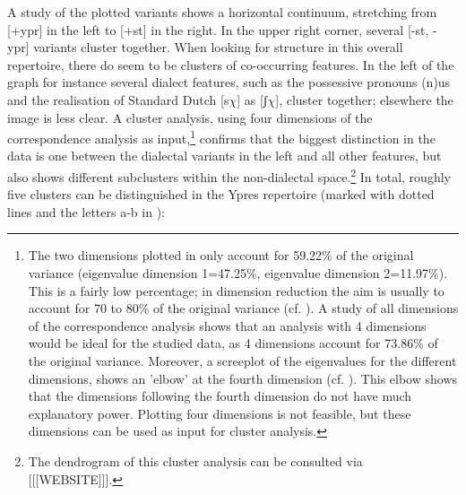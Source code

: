 \documentclass[output=paper]{LSP/langsci}
\begin{document}
A study of the plotted variants shows a horizontal continuum, stretching from [+ypr] in the left to [+st] in the right. In the upper right corner, several [-st, -ypr] variants cluster together. When looking for structure in this overall repertoire, there do seem to be clusters of co-occurring features. In the left of the graph for instance several dialect features, such as the possessive pronouns (n)us and the realisation of Standard Dutch [s$\chi $] as [ʃ$\chi $], cluster together; elsewhere the image is less clear. A cluster analysis, using four dimensions of the correspondence analysis as input,\footnote{The two dimensions plotted in  only account for 59.22\% of the original variance (eigenvalue dimension 1=47.25\%, eigenvalue dimension 2=11.97\%). This is a fairly low percentage; in dimension reduction the aim is usually to account for 70 to 80\% of the original variance (cf. \citealt[83--84]{di_franco_factor_2014}). A study of all dimensions of the correspondence analysis shows that an analysis with 4 dimensions would be ideal for the studied data, as 4 dimensions account for 73.86\% of the original variance. Moreover, a screeplot of the eigenvalues for the different dimensions, shows an 'elbow' at the fourth dimension (cf. \citealt[83--84]{di_franco_factor_2014}). This elbow shows that the dimensions following the fourth dimension do not have much explanatory power. Plotting four dimensions is not feasible, but these dimensions can be used as input for cluster analysis.} confirms that the biggest distinction in the data is one between the dialectal variants in the left and all other features, but also shows different subclusters within the non-dialectal space.\footnote{The dendrogram of this cluster analysis can be consulted via [[[WEBSITE]]].} In total, roughly five clusters can be distinguished in the Ypres repertoire (marked with dotted lines and the letters a-b in ):
\end{document}
